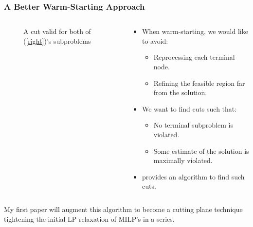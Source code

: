 \documentclass{beamer}
\begin{document}
	\begin{frame}[t]
		\frametitle{A Better Warm-Starting Approach}
		\small
		\begin{columns}[T]
			\begin{column}{0.4\textwidth}
				\vspace{-.25cm}
				\begin{figure}[h]
					\caption{A cut valid for both of (\ref{right})'s subproblems}
					\label{p:hull}
				\end{figure}
			\end{column}
			\begin{column}{0.6\textwidth}
				\begin{itemize}
					\item When warm-starting, we would like to avoid:
					\begin{itemize}
						\item Reprocessing each terminal node.
						\item Refining the feasible region far from the solution.
					\end{itemize}
					\item We want to find cuts such that:
					\begin{itemize}
						\item No terminal subproblem is violated.
						\item Some estimate of the solution is maximally violated.
					\end{itemize}
					\item \cite{aleks} provides an algorithm to find such cuts.
				\end{itemize}
			\end{column}
		\end{columns}
		\vspace{.5cm}
		\begin{block}{}
			My first paper will augment this algorithm to become a cutting plane technique tightening the initial LP relaxation of MILP's in a series.
		\end{block}
		\normalsize
	\end{frame}
\end{document}
